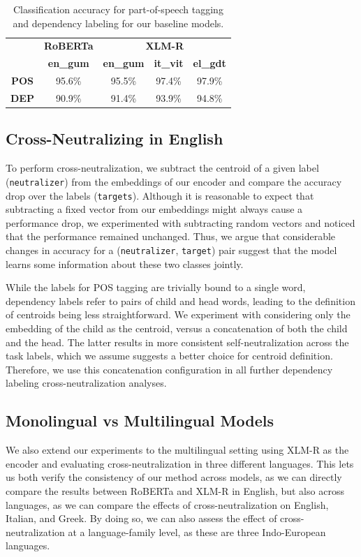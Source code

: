 \documentclass[11pt,a4paper]{article}
\begin{document}
\begin{table}[ht]
\small
\centering
\begin{tabular}{c|c|ccc|}
             & \textbf{RoBERTa} & \multicolumn{3}{c|}{\textbf{XLM-R}}                    \\ \cline{2-5} 
             & \textbf{en\_gum} & \textbf{en\_gum} & \textbf{it\_vit} & \textbf{el\_gdt} \\ \cline{2-5}
\textbf{POS} & 95.6\%           & 95.5\%           & 97.4\%           & 97.9\%           \\
\textbf{DEP} & 90.9\%           & 91.4\%           & 93.9\%           & 94.8\%           
\end{tabular}
\caption{Classification accuracy for part-of-speech tagging and dependency labeling for our baseline models.}
\label{tab:baseline_acc}
\end{table}

\subsection{Cross-Neutralizing in English}
To perform cross-neutralization, we subtract the centroid of a given label (\texttt{neutralizer}) from the embeddings of our encoder and compare the accuracy drop over the labels (\texttt{targets}). Although it is reasonable to expect that subtracting a fixed vector from our embeddings might always cause a performance drop, we experimented with subtracting random vectors and noticed that the performance remained unchanged. Thus, we argue that considerable changes in accuracy for a (\texttt{neutralizer}, \texttt{target}) pair suggest that the model learns some information about these two classes jointly.

While the labels for POS tagging are trivially bound to a single word, dependency labels refer to pairs of child and head words, leading to the definition of centroids being less straightforward. We experiment with considering only the embedding of the child as the centroid, versus a concatenation of both the child and the head. The latter results in more consistent self-neutralization across the task labels, which we assume suggests a better choice for centroid definition. Therefore, we use this concatenation configuration in all further dependency labeling cross-neutralization analyses.

\subsection{Monolingual vs Multilingual Models}
We also extend our experiments to the multilingual setting using XLM-R as the encoder and evaluating cross-neutralization in three different languages. This lets us both verify the consistency of our method across models, as we can directly compare the results between RoBERTa and XLM-R in English, but also across languages, as we can compare the effects of cross-neutralization on English, Italian, and Greek. By doing so, we can also assess the effect of cross-neutralization at a language-family level, as these are three Indo-European languages.
\end{document}
